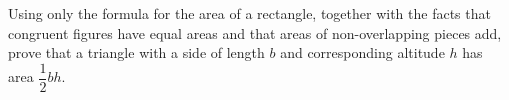 Using only the formula for the area of a rectangle, together with the facts that congruent figures have equal areas and that areas of non-overlapping pieces add, prove that a triangle with a side of length $b$ and corresponding altitude $h$ has area $\dfrac12bh$.
